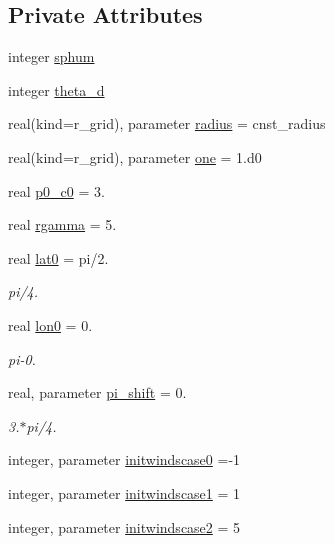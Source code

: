 \subsection*{Private Attributes}
\begin{DoxyCompactItemize}
\item 
integer \hyperlink{classtest__cases__mod_a2fb47f8d0671dcb58a188245f3561fc0}{sphum}
\item 
integer \hyperlink{classtest__cases__mod_adc983b10c9af89dbc2a6b4cbd5957918}{theta\-\_\-d}
\item 
real(kind=r\-\_\-grid), parameter \hyperlink{classtest__cases__mod_aaab38fce650165338c7b083b6d69fe14}{radius} = cnst\-\_\-radius
\item 
real(kind=r\-\_\-grid), parameter \hyperlink{classtest__cases__mod_a9fee1aae0eeafb2591001b28a9890b6c}{one} = 1.d0
\item 
real \hyperlink{classtest__cases__mod_ab4fbd1f2da9a9bedc6197a62d77e4f57}{p0\-\_\-c0} = 3.
\item 
real \hyperlink{classtest__cases__mod_a414edbd9fc49e5bf42449aa09ea4b4b5}{rgamma} = 5.
\item 
real \hyperlink{classtest__cases__mod_a64407c4ddac683d907f7f42813602720}{lat0} = pi/2.
\begin{DoxyCompactList}\small\item\em pi/4. \end{DoxyCompactList}\item 
real \hyperlink{classtest__cases__mod_a982d8969b8cd286c0d2749f4a85fab51}{lon0} = 0.
\begin{DoxyCompactList}\small\item\em pi-\/0. \end{DoxyCompactList}\item 
real, parameter \hyperlink{classtest__cases__mod_ac52bff5875e95e0bc36377a076e3ba63}{pi\-\_\-shift} = 0.
\begin{DoxyCompactList}\small\item\em 3.$\ast$pi/4. \end{DoxyCompactList}\item 
integer, parameter \hyperlink{classtest__cases__mod_a344cd0cb1ee73dc4346c3291c532432f}{initwindscase0} =-\/1
\item 
integer, parameter \hyperlink{classtest__cases__mod_ae0e779adc02d8de0967072c92e081e76}{initwindscase1} = 1
\item 
integer, parameter \hyperlink{classtest__cases__mod_a67b8fe8f9c6ecc1f39e3efb965081229}{initwindscase2} = 5

\end{DoxyCompactItemize}
